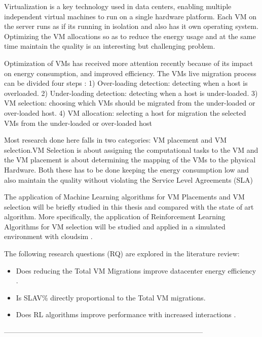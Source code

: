 \documentclass[a4paper,12pt]{Classes/RoboticsLaTeX}
\begin{document}
    Virtualization is a key technology used in data centers, enabling  multiple independent virtual machines to run on a single hardware platform. Each VM on the server runs as if its running in isolation and also has it own operating system. Optimizing the VM allocations so as to reduce the energy usage and at the same time maintain the quality is an interesting but challenging problem.\cite{choudhary2017critical}
    
    Optimization of VMs has received more attention recently because of its impact on energy consumption, and improved efficiency. 
    The VMs live migration process can be divided four steps \cite{hsieh2020utilization}: 1) Over-loading detection: detecting when a host is overloaded. 2) Under-loading detection: detecting when a host is under-loaded. 3) VM selection: choosing which VMs should be migrated from the under-loaded or over-loaded host. 4) VM allocation: selecting a host for migration the selected VMs from the under-loaded or over-loaded host

    Most research done here falls in two categories: VM placement and VM selection.VM Selection is about assigning the computational tasks to the VM and the VM placement is about determining the mapping of the VMs to the physical Hardware.\cite{mann2016interplay} Both these has to be done keeping the energy consumption low and also maintain the quality without violating the Service Level Agreements (SLA)

    The application of Machine Learning algorithms for VM Placements and VM selection will be briefly studied in this thesis and compared with the state of art algorithm. More specifically, the application of Reinforcement Learning Algorithms for VM selection will be studied and applied in a simulated environment with cloudsim . 

    \noindent The following research questions (RQ) are explored in the literature review:
    \begin{itemize}
        \item Does reducing the Total VM Migrations improve datacenter energy efficiency .
        \item Is SLAV\% directly proportional to the Total VM migrations.
        \item Does RL algorithms improve performance with increased interactions  .
    \end{itemize}
	
	
	------------------------------------------------------------------------------------
	
\end{document}
